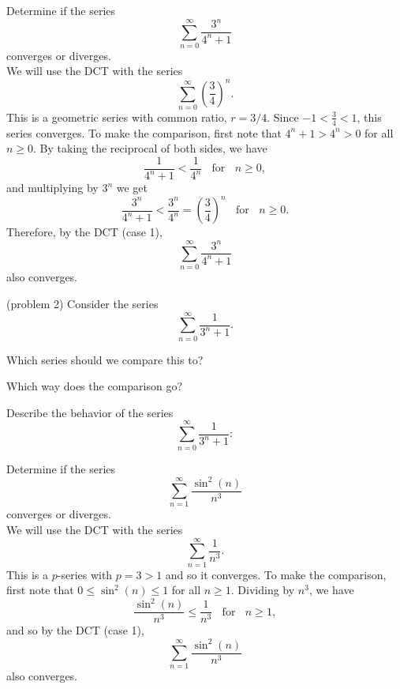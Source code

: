 \documentclass[handout]{ximera}
\begin{document}
\begin{example}[example 2] %
Determine if the series 
\[
\sum_{n=0}^\infty \frac{3^n}{4^n + 1}
\]
 converges or diverges.\\
We will use the DCT with the series 
\[
\sum_{n=0}^\infty \left(\frac34\right)^n.
\]
 This is a geometric series with common ratio, $r = 3/4$. Since $-1 < \frac 34 < 1$, this series converges.
To make the comparison, first note that $4^n + 1 > 4^n > 0$ for all $n \geq 0$. By taking the reciprocal of both sides,
we have 
\[
\frac{1}{4^n + 1} < \frac{1}{4^n} \; \; \text{ for } \;\; n \geq 0,
\]
and multiplying by $3^n$ we get
\[
\frac{3^n}{4^n + 1} < \frac{3^n}{4^n} = \left(\frac34\right)^n \;\; \text{ for } \;\; n \geq 0.
\]
Therefore, by the DCT (case 1), 
\[
\sum_{n=0}^\infty \frac{3^n}{4^n + 1}
\]
 also converges.
\end{example}


\begin{problem}(problem 2)
Consider the series 
\[
\sum_{n=0}^\infty \frac{1}{3^n + 1}.
\]

Which series should we compare this to?

\begin{multipleChoice}
\end{multipleChoice}

Which way does the comparison go?
\begin{multipleChoice}
\end{multipleChoice}

Describe the behavior of the series 
\[
\sum_{n=0}^\infty \frac{1}{3^n + 1}:
\]

\begin{multipleChoice}
\end{multipleChoice}

\end{problem}



\begin{example}[example 3] %
Determine if the series 
\[
\sum_{n=1}^\infty \frac{\sin^2(n)}{n^3}
\]
 converges or diverges.\\
We will use the DCT with the series 
\[
\sum_{n=1}^\infty \frac{1}{n^3}.
\]
This is a $p$-series with $p=3 >1$ and so it converges.
To make the comparison, first note that $0 \leq \sin^2(n) \leq 1$ for all $n \geq 1$. Dividing by $n^3$,
we have 
\[
\frac{\sin^2(n)}{n^3} \leq \frac{1}{n^3} \; \; \text{ for } \; \; n \geq 1,
\]
and so by the DCT (case 1), 
\[
\sum_{n=1}^\infty \frac{\sin^2(n)}{n^3}
\]
 also converges.
\end{example}
\end{document}
